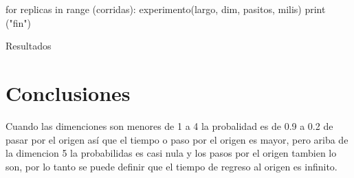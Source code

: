 \documentclass{article}
\begin{document}
for replicas in range (corridas):
experimento(largo, dim, pasitos, milis)
print ("fin")

Resultados


\section{Conclusiones}
Cuando las dimenciones son menores de 1 a 4 la probalidad es de 0.9 a 0.2 de pasar por el origen as\'{i} que el tiempo o paso por el origen es mayor, pero ariba de la dimencion 5 la probabilidas es casi nula y los pasos por el origen tambien lo son, por lo tanto se puede definir que el tiempo de regreso al origen es infinito.
\end{document}
